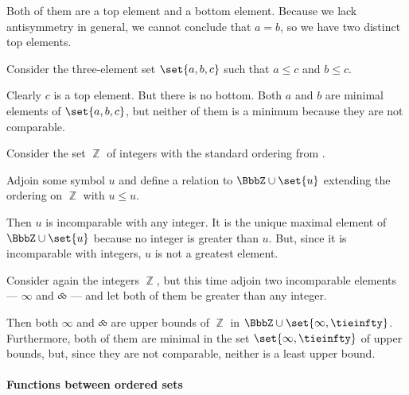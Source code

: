 \begin{example}
\begin{thmenum}
    Both of them are a top element and a bottom element. Because we lack antisymmetry in general, we cannot conclude that \( a = b \), so we have two distinct top elements.

     Consider the three-element set \( \set{ a, b, c } \) such that \( a \leq c \) and \( b \leq c \).

    Clearly \( c \) is a top element. But there is no bottom. Both \( a \) and \( b \) are minimal elements of \( \set{ a, b, c } \), but neither of them is a minimum because they are not comparable.

     Consider the set \( \BbbZ \) of integers with the standard ordering from .

    Adjoin some symbol \( u \) and define a relation to \( \BbbZ \cup \set{ u } \) extending the ordering on \( \BbbZ \) with \( u \leq u \).

    Then \( u \) is incomparable with any integer. It is the unique maximal element of \( \BbbZ \cup \set{ u } \) because no integer is greater than \( u \). But, since it is incomparable with integers, \( u \) is not a greatest element.

     Consider again the integers \( \BbbZ \), but this time adjoin two incomparable elements --- \( \infty \) and \( \tieinfty \) --- and let both of them be greater than any integer.

    Then both \( \infty \) and \( \tieinfty \) are upper bounds of \( \BbbZ \) in \( \BbbZ \cup \set{ \infty, \tieinfty } \). Furthermore, both of them are minimal in the set \( \set{ \infty, \tieinfty } \) of upper bounds, but, since they are not comparable, neither is a least upper bound.
  \end{thmenum}
\end{example}

\paragraph{Functions between ordered sets}

